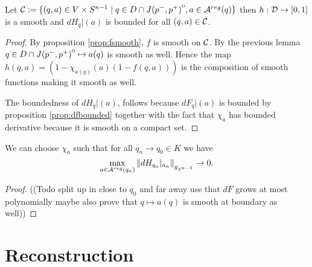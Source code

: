 \begin{corollary}
    Let ${\mathcal{C}}:=\{(q,a)\in V\times {S^{n-1}} \mid q \in D\cap {\kern0ptJ(p^-,p^+)}^{\mathrm{o}}, a\in {{\mathcal{A}}^{reg}}(q)\}$ then $h:{\mathcal{D}}\to [0,1]$ is a smooth and $dH_q\rvert(a)$ is bounded for all $(q,a)\in {\mathcal{C}}$.
\end{corollary}
\begin{proof}
    By proposition \ref{prop:fsmooth}, $f$ is smooth on ${\mathcal{C}}$. By the previous lemma $q\in D\cap {\kern0ptJ(p^-,p^+)}^{\mathrm{o}}\mapsto a(q)$ is smooth as well.
    Hence the map $h(q,a) = (1-\chi_{a(q)}(a)(1-f(q,a)))$ is the composition of smooth functions making it smooth as well.

    The boundedness of $dH_q\rvert(a)$, follows because $dF_q\rvert(a)$ is bounded by proposition \ref{prop:dfbounded} together with the fact that $\chi_{a}$ has bounded derivative because it is smooth on a compact set.
\end{proof}

\begin{lemma}\label{lem:dhconvonboundary}
    We can choose $\chi_a$ such that for all $q_n \to q_0\in K$ we have
    \[
        \max_{a\in {{\mathcal{A}}^{reg}}(q_n)} \left\lVert dH_{q_n}\rvert_{a_n}\right\rVert_{g_{S^{n-1}}}\to 0.
    \]
\end{lemma}
\begin{proof}
    ((Todo split up in close to $q_0$ and far away use that $dF$ grows at most polynomially maybe also prove that $q\mapsto a(q)$ is smooth at boundary as well))
\end{proof}

\section{Reconstruction}
